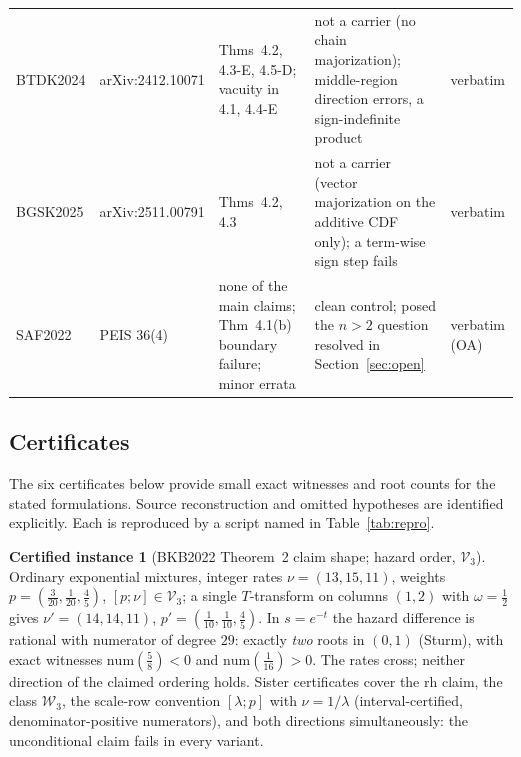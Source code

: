 \documentclass[10pt]{article}
\theoremstyle{plain}
\theoremstyle{definition}
\newtheorem{certificate}[theorem]{Certified instance}
\theoremstyle{remark}
\begin{document}
\begin{table}[t]
\begin{tabular}{@{}l l >{\raggedright\arraybackslash}p{4.0cm} >{\raggedright\arraybackslash}p{5.2cm} l@{}}
BTDK2024 \cite{BhaktaTorradoDasKayal2024} & arXiv:2412.10071 & Thms~4.2, 4.3-E, 4.5-D; vacuity in 4.1, 4.4-E & not a carrier (no chain majorization); middle-region direction errors, a sign-indefinite product & verbatim \\
BGSK2025 \cite{BhaktaGuptaSaadatKiaKayal2025} & arXiv:2511.00791 & Thms~4.2, 4.3 & not a carrier (vector majorization on the additive CDF only); a term-wise sign step fails & verbatim \\
SAF2022 \cite{ShojaeeAsadiFinkelstein2022} & PEIS 36(4) & none of the main claims; Thm~4.1(b) boundary failure; minor errata & clean control; posed the $n>2$ question resolved in Section~\ref{sec:open} & verbatim (OA) \\
\bottomrule
\end{tabular}
\end{table}

\subsection{Certificates}\label{sec:certs}

The six certificates below provide small exact witnesses and root counts for the stated formulations. Source reconstruction and omitted hypotheses are identified explicitly. Each is reproduced by a script named in Table~\ref{tab:repro}.

\begin{certificate}[BKB2022 Theorem~2 claim shape; hazard order, $\mathcal V_3$]\label{cer:bkb}
Ordinary exponential mixtures, integer rates $\nu=(13,15,11)$, weights $p=(\tfrac3{20},\tfrac1{20},\tfrac45)$, $[p;\nu]\in\mathcal V_3$; a single $T$-transform on columns $(1,2)$ with $\omega=\tfrac12$ gives $\nu'=(14,14,11)$, $p'=(\tfrac1{10},\tfrac1{10},\tfrac45)$. In $s=e^{-t}$ the hazard difference is rational with numerator of degree $29$: exactly \emph{two} roots in $(0,1)$ (Sturm), with exact witnesses $\mathrm{num}(\tfrac5{8})<0$ and $\mathrm{num}(\tfrac1{16})>0$. The rates cross; neither direction of the claimed ordering holds. Sister certificates cover the rh claim, the class $\mathcal W_3$, the scale-row convention $[\lambda;p]$ with $\nu=1/\lambda$ (interval-certified, denominator-positive numerators), and both directions simultaneously: the unconditional claim fails in every variant.
\end{certificate}
\end{document}

